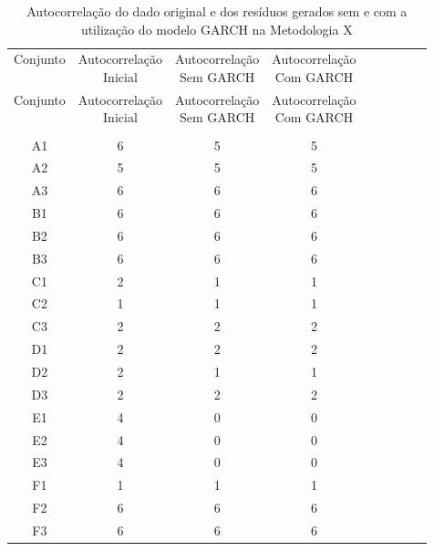 \begin{center}
\begin{longtable}{ccccc|cccc}
\toprule
\rowcolor{white}
\caption[Metodologia X: evolução da autocorrelação]{Autocorrelação do dado
original e dos resíduos gerados sem e com a utilização do modelo GARCH na
Metodologia X} \label{tab:EvolucaoAutocorrelacaoMet10}\\
\midrule
Conjunto & \specialcell{Autocorrelação\\Inicial} & \specialcell{Autocorrelação\\Sem
GARCH} & \specialcell{Autocorrelação\\Com GARCH} \\
\midrule
\endfirsthead 
\midrule
\rowcolor{white}
Conjunto & \specialcell{Autocorrelação\\Inicial} & \specialcell{Autocorrelação\\Sem
GARCH} & \specialcell{Autocorrelação\\Com GARCH} \\
\toprule
\endhead
\midrule \\ %
\endfoot
\bottomrule 
\endlastfoot
A1    & 6     & 5     & 5 \\
A2    & 5     & 5     & 5 \\
A3    & 6     & 6     & 6 \\
B1    & 6     & 6     & 6 \\
B2    & 6     & 6     & 6 \\
B3    & 6     & 6     & 6 \\
C1    & 2     & 1     & 1 \\
C2    & 1     & 1     & 1 \\
C3    & 2     & 2     & 2 \\
D1    & 2     & 2     & 2 \\
D2    & 2     & 1     & 1 \\
D3    & 2     & 2     & 2 \\
E1    & 4     & 0     & 0 \\
E2    & 4     & 0     & 0 \\
E3    & 4     & 0     & 0 \\
F1    & 1     & 1     & 1 \\
F2    & 6     & 6     & 6 \\
F3    & 6     & 6     & 6 \\

\end{longtable}
\end{center}
